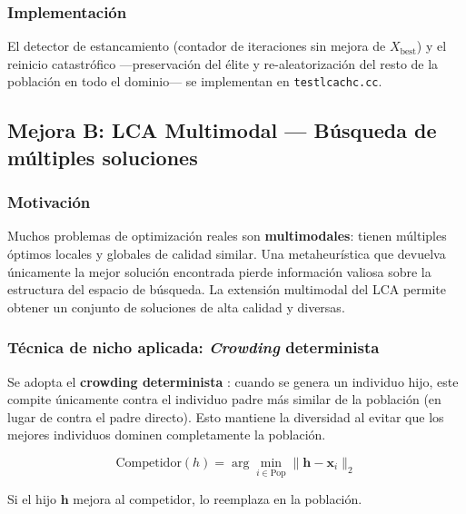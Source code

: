 \subsubsection{Implementación}

El detector de estancamiento (contador de iteraciones sin mejora de
$X_{\text{best}}$) y el reinicio catastrófico ---preservación del élite y
re-aleatorización del resto de la población en todo el dominio--- se implementan
en \texttt{testlcachc.cc}.

\subsection{Mejora B: LCA Multimodal — Búsqueda de múltiples soluciones}

\subsubsection{Motivación}

Muchos problemas de optimización reales son \textbf{multimodales}: tienen múltiples
óptimos locales y globales de calidad similar. Una metaheurística que devuelva
únicamente la mejor solución encontrada pierde información valiosa sobre la estructura
del espacio de búsqueda. La extensión multimodal del LCA permite obtener un conjunto
de soluciones de alta calidad y diversas.

\subsubsection{Técnica de nicho aplicada: \emph{Crowding} determinista}

Se adopta el \textbf{crowding determinista} \cite{mahfoud1995niching}: cuando se genera
un individuo hijo, este compite únicamente contra el individuo padre más similar de la
población (en lugar de contra el padre directo). Esto mantiene la diversidad al evitar
que los mejores individuos dominen completamente la población.

\begin{equation}
  \text{Competidor}(h) = \arg\min_{i \in \text{Pop}} \|\mathbf{h} - \mathbf{x}_i\|_2
  \label{eq:crowding}
\end{equation}

Si el hijo $\mathbf{h}$ mejora al competidor, lo reemplaza en la población.

